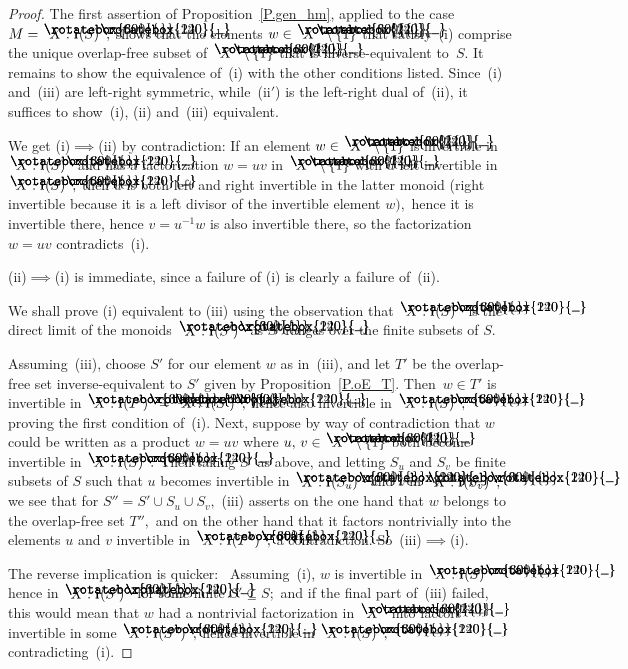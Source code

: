 \documentclass{amsart}
\numberwithin{equation}{section}
\newcommand{\I}{\mathbf{i}\hspace{.05em}}
\newcommand{\langl}{\begin{picture}(.51em,1em)
\put(.11em,.33em){\rotatebox{60}{\line(1,0){.55em}}}
\put(.11em,.33em){\rotatebox{300}{\line(1,0){.55em}}}
\end{picture}}
\newcommand{\rangl}{\begin{picture}(.5em,1em)
\put(.09em,.33em){\rotatebox{120}{\line(1,0){.55em}}}
\put(.09em,.33em){\rotatebox{240}{\line(1,0){.55em}}}
\end{picture}}
\begin{document}
\begin{proof}
The first assertion of Proposition~\ref{P.gen_hm},
applied to the case $M=\langl X:\I(S)\rangl,$ shows that the elements
$w\in\langl X\rangl\setminus\{1\}$ that satisfy~(i) comprise
the unique overlap-free subset of $\langl X\rangl\setminus\{1\}$ that
is inverse-equivalent to~$S.$
It remains to show the equivalence of~(i) with the
other conditions listed.
Since~(i) and~(iii) are left-right symmetric, while~(ii$\!'\!$)
is the left-right dual of~(ii),
it suffices to show~(i), (ii) and~(iii) equivalent.

We get (i)$\implies$(ii) by contradiction:  If an element
$w\in\langl X\rangl\setminus\{1\}$
is invertible in $\langl X:\I(S)\rangl$ and has a factorization
$w=uv$ in $\langl X\rangl\setminus\{1\}$
with $u$ left invertible in $\langl X:\I(S)\rangl,$
then $u$ is both left and right invertible in the latter monoid
(right invertible because it is a left divisor of the
invertible element $w),$ hence it is invertible
there, hence $v=u^{-1}w$ is also invertible there,
so the factorization $w=uv$ contradicts~(i).

(ii)$\implies$(i) is immediate, since a failure of (i) is clearly
a failure of~(ii).

We shall prove (i) equivalent to (iii) using the
observation that $\langl X:\I(S)\rangl$ is the direct limit
of the monoids $\langl X:\I(S')\rangl$ as $S'$ ranges over
the finite subsets of $S.$

Assuming~(iii), choose $S'$ for our element $w$ as in~(iii),
and let $T'$ be the overlap-free set inverse-equivalent to $S'$
given by Proposition~\ref{P.oE_T}.
Then~$w\in T'$ is invertible
in $\langl X:\I(T')\rangl=\langl X:\I(S')\rangl,$ hence
also invertible in $\langl X:\I(S)\rangl,$ proving
the first condition of~(i).
Next, suppose by way of contradiction that $w$ could be written
as a product $w=uv$ where $u,\,v\in\langl X\rangl\setminus\{1\}$
both become invertible in $\langl X:\I(S)\rangl.$
Then taking $S'$ as above, and letting $S_u$ and $S_v$
be finite subsets of $S$ such that $u$ becomes invertible
in $\langl X:\I(S_u)\rangl$ and $v$ in $\langl X:\I(S_v)\rangl,$
we see that for $S''=S'\cup S_u \cup S_v,$ (iii) asserts
on the one hand that $w$ belongs to the overlap-free set $T'',$
and on the other hand that it
factors nontrivially into the elements $u$ and $v$
invertible in $\langl X:\I(T'')\rangl,$ a contradiction.
So~(iii)$\implies$(i).

The reverse implication is quicker: \ Assuming~(i),
$w$ is invertible in $\langl X:\I(S)\rangl$ hence in
$\langl X:\I(S')\rangl$ for some finite $S'\subseteq S;$
and if the final part of~(iii) failed, this would mean
that $w$ had a nontrivial factorization in $\langl X\rangl$
into factors invertible in some $\langl X:\I(S'')\rangl,$
hence invertible in $\langl X:\I(S)\rangl,$ contradicting~(i).
\end{proof}
\end{document}
